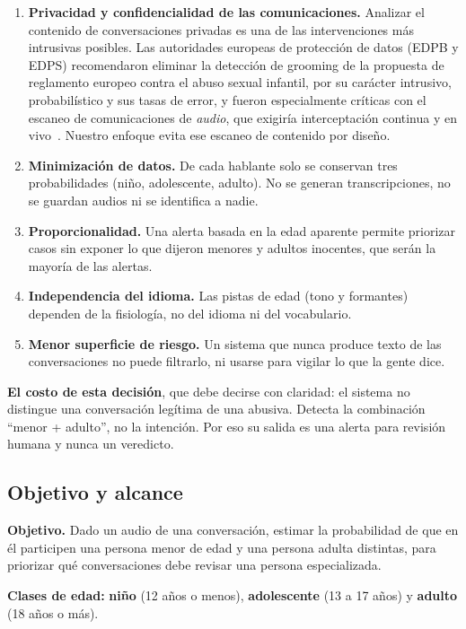 \documentclass[11pt,a4paper]{article}
\begin{document}
\begin{enumerate}
  \item \textbf{Privacidad y confidencialidad de las comunicaciones.} Analizar el contenido de conversaciones privadas es una de las intervenciones más intrusivas posibles. Las autoridades europeas de protección de datos (EDPB y EDPS) recomendaron eliminar la detección de grooming de la propuesta de reglamento europeo contra el abuso sexual infantil, por su carácter intrusivo, probabilístico y sus tasas de error, y fueron especialmente críticas con el escaneo de comunicaciones de \emph{audio}, que exigiría interceptación continua y en vivo~\cite{edpb2022}. Nuestro enfoque evita ese escaneo de contenido por diseño.
  \item \textbf{Minimización de datos.} De cada hablante solo se conservan tres probabilidades (niño, adolescente, adulto). No se generan transcripciones, no se guardan audios ni se identifica a nadie.
  \item \textbf{Proporcionalidad.} Una alerta basada en la edad aparente permite priorizar casos sin exponer lo que dijeron menores y adultos inocentes, que serán la mayoría de las alertas.
  \item \textbf{Independencia del idioma.} Las pistas de edad (tono y formantes) dependen de la fisiología, no del idioma ni del vocabulario.
  \item \textbf{Menor superficie de riesgo.} Un sistema que nunca produce texto de las conversaciones no puede filtrarlo, ni usarse para vigilar lo que la gente dice.
\end{enumerate}

\textbf{El costo de esta decisión}, que debe decirse con claridad: el sistema no distingue una conversación legítima de una abusiva. Detecta la combinación ``menor + adulto'', no la intención. Por eso su salida es una alerta para revisión humana y nunca un veredicto.

\subsection{Objetivo y alcance}

\textbf{Objetivo.} Dado un audio de una conversación, estimar la probabilidad de que en él participen una persona menor de edad y una persona adulta distintas, para priorizar qué conversaciones debe revisar una persona especializada.

\textbf{Clases de edad:} \textbf{niño} (12 años o menos), \textbf{adolescente} (13 a 17 años) y \textbf{adulto} (18 años o más).
\end{document}
